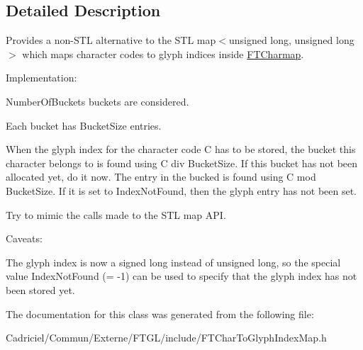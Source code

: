 \subsection{Detailed Description}
Provides a non-\/\+S\+TL alternative to the S\+TL map$<$unsigned long, unsigned long$>$ which maps character codes to glyph indices inside \hyperlink{class_f_t_charmap}{F\+T\+Charmap}.

Implementation\+:
\begin{DoxyItemize}
\item Number\+Of\+Buckets buckets are considered.
\item Each bucket has Bucket\+Size entries.
\item When the glyph index for the character code C has to be stored, the bucket this character belongs to is found using \textquotesingle{}C div Bucket\+Size\textquotesingle{}. If this bucket has not been allocated yet, do it now. The entry in the bucked is found using \textquotesingle{}C mod Bucket\+Size\textquotesingle{}. If it is set to Index\+Not\+Found, then the glyph entry has not been set.
\item Try to mimic the calls made to the S\+TL map A\+PI.
\end{DoxyItemize}

Caveats\+:
\begin{DoxyItemize}
\item The glyph index is now a signed long instead of unsigned long, so the special value Index\+Not\+Found (= -\/1) can be used to specify that the glyph index has not been stored yet. 
\end{DoxyItemize}

The documentation for this class was generated from the following file\+:\begin{DoxyCompactItemize}
\item 
Cadriciel/\+Commun/\+Externe/\+F\+T\+G\+L/include/F\+T\+Char\+To\+Glyph\+Index\+Map.\+h\end{DoxyCompactItemize}
